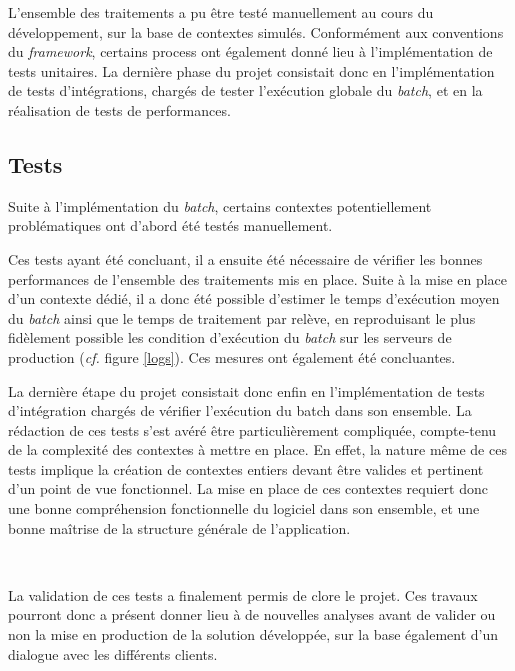 \documentclass[a4paper, 12pt]{report}
\begin{document}
L'ensemble des traitements a pu être testé manuellement au cours du développement, sur la base de contextes simulés. Conformément aux conventions du \textit{framework}, certains process ont également donné lieu à l'implémentation de tests unitaires. La dernière phase du projet consistait donc en l'implémentation de tests d'intégrations, chargés de tester l'exécution globale du \textit{batch}, et en la réalisation de tests de performances.

\subsection{Tests}

Suite à l'implémentation du \textit{batch}, certains contextes potentiellement problématiques ont d'abord été testés manuellement. 

Ces tests ayant été concluant, il a ensuite été nécessaire de vérifier les bonnes performances de l'ensemble des traitements mis en place. Suite à la mise en place d'un contexte dédié, il a donc été possible d'estimer le temps d'exécution moyen du \textit{batch} ainsi que le temps de traitement par relève, en reproduisant le plus fidèlement possible les condition d'exécution du \textit{batch} sur les serveurs de production (\textit{cf.} figure \ref{logs}). Ces mesures ont également été concluantes.

La dernière étape du projet consistait donc enfin en l'implémentation de tests d'intégration chargés de vérifier l'exécution du batch dans son ensemble. La rédaction de ces tests s'est avéré être particulièrement compliquée, compte-tenu de la complexité des contextes à mettre en place. En effet, la nature même de ces tests implique la création de contextes entiers devant être valides et pertinent d'un point de vue fonctionnel. La mise en place de ces contextes requiert donc une bonne compréhension fonctionnelle du logiciel dans son ensemble, et une bonne maîtrise de la structure générale de l'application.\\

\begin{center}
\noindent*\\
\end{center}

La validation de ces tests a finalement permis de clore le projet. Ces travaux pourront donc a présent donner lieu à de nouvelles analyses avant de valider ou non la mise en production de la solution développée, sur la base également d'un dialogue avec les différents clients.
\end{document}
